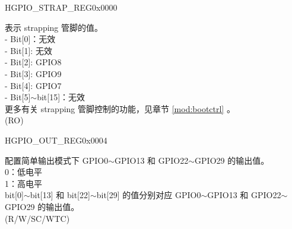 \begin{register}{H}{GPIO\_STRAP\_REG}{0x0000}\label{regdesc:GPIOSTRAPREG}
%
%
\regnewline%
\begin{regdesc}\begin{reglist}
\label{fielddesc:GPIOSTRAPPING}\item [GPIO\_STRAPPING] 表示 strapping 管脚的值。\\
    - Bit[0]：无效\\
    - Bit[1]: 无效\\
    - Bit[2]: GPIO8\\
    - Bit[3]: GPIO9\\
    - Bit[4]: GPIO7\\
    - Bit[5]$\sim$bit[15]：无效\\
更多有关 strapping 管脚控制的功能，见章节 \ref{mod:bootctrl} \textit{}。\\
 (RO)
\end{reglist}\end{regdesc}
\end{register}


\begin{register}{H}{GPIO\_OUT\_REG}{0x0004}\label{regdesc:GPIOOUTREG}
%
\regnewline%
\begin{regdesc}\begin{reglist}
\label{fielddesc:GPIOOUTDATAORIG}\item [GPIO\_OUT\_DATA\_ORIG] 配置简单输出模式下 GPIO0$\sim$GPIO13 和 GPIO22$\sim$GPIO29 的输出值。\\
0：低电平\\
1：高电平\\ 
bit[0]$\sim$bit[13] 和 bit[22]$\sim$bit[29] 的值分别对应 GPIO0$\sim$GPIO13 和 GPIO22$\sim$GPIO29 的输出值。\\
(R/W/SC/WTC)
\end{reglist}\end{regdesc}
\end{register}



